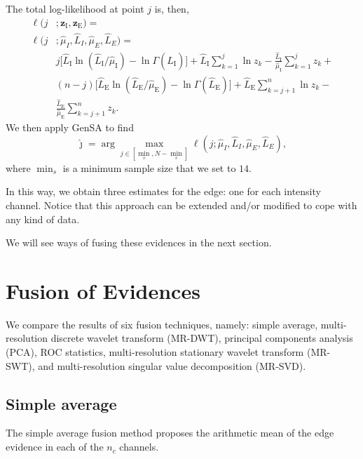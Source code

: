 \documentclass[journal]{IEEEtran}
\begin{document}
The total log-likelihood at point $j$ is, then,
\begin{equation}\label{eq:TotalLogLikelihood}
\begin{split}
\ell(j&;\bm z_\text{I},\bm z_\text{E}) = \\
\ell(j&;\widehat{\mu}_I, \widehat{L}_I,\widehat{\mu}_E, \widehat{L}_E)=\\
&j \big[\widehat{L}_\text{I}\ln (\widehat{L}_\text{I} / \widehat{\mu}_\text{I}) - \ln \Gamma(\widehat{L}_\text{I})\big]
+\widehat{L}_\text{I} \sum_{k=1}^{j}\ln z_k -\frac{\widehat{L}_\text{I}}{\widehat{\mu}_\text{I}}\sum_{k=1}^{j} z_k +\\
&(n-j) \big[\widehat{L}_\text{E}\ln (\widehat{L}_\text{E} / \widehat{\mu}_\text{E}) - \ln \Gamma(\widehat{L}_\text{E})\big]
+\widehat{L}_\text{E} \sum_{k=j+1}^{n}\ln z_k -\\ &\frac{\widehat{L}_\text{E}}{\widehat{\mu}_\text{E}}\sum_{k=j+1}^{n} z_k.
\end{split}
\end{equation}
We then apply GenSA to find  
$$
\widehat{\jmath}= \arg\max\limits_{j\in [\min_s,N-\min_s]}\ell(j;\widehat{\mu}_I, \widehat{L}_I,\widehat{\mu}_E, \widehat{L}_E),
$$ 
where $\min_s$ is a minimum sample size that we set to $14$.

In this way, we obtain three estimates for the edge: one for each intensity channel.
Notice that this approach can be extended and/or modified to cope with any kind of data.

We will see ways of fusing these evidences in the next section.

\section{Fusion of Evidences}\label{sec_04}

We compare the results of six fusion techniques, namely:
simple average, 
multi-resolution discrete wavelet transform (MR-DWT),
principal components analysis (PCA), 
ROC statistics,
multi-resolution stationary wavelet transform (MR-SWT), and
multi-resolution singular value decomposition (MR-SVD).


\subsection{Simple average}
The simple average fusion method proposes the arithmetic mean of the edge evidence in each of the $n_c$ channels.
\end{document}
